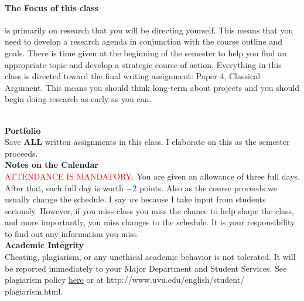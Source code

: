 \documentclass[11pt]{article}
\begin{document}
\paragraph{The Focus of this class}   
is primarily on research that you will be directing yourself. This means that you need to develop a research agenda in conjunction with the course outline and goals. There is time given at the beginning of the semester to help you find an appropriate topic and develop a strategic course of action. Everything in this class is directed toward the final writing assignment: Paper 4, Classical Argument. This means you should think long-term about projects and you should begin doing research as early as you can.

\ \\
 {\bf Portfolio}\\
   Save {\bf ALL} written assignments in this class. I elaborate on this as the semester proceeds.
  \\ 

   {\bf Notes on the Calendar}\\
   \textcolor{red}{ATTENDANCE IS MANDATORY}. You are given an allowance of three full days. After that, each full day is worth $-2$ points. Also as the course proceeds we usually change the schedule. I say {\it we} because I take input from students seriously. However, if you miss class you miss the chance to help shape the class, and more importantly, you miss changes to the schedule. It is your responsibility to find out any information you miss.
   \\ 
       

   {\bf Academic Integrity}\\
 Cheating, plagiarism, or any unethical academic behavior is not tolerated. It will be reported immediately to 
your Major Department and Student Services. See plagiarism policy 
\href{http://www.uvu.edu/english/student/plagiarism.html}{here} or at http://www.uvu.edu/english/student/
plagiarism.html.
 \\
\end{document}
